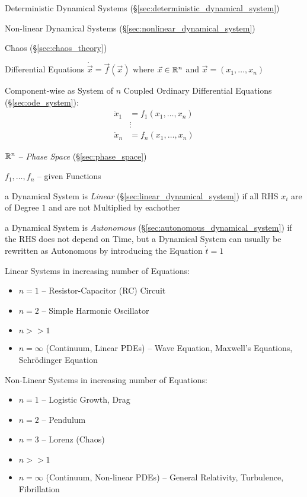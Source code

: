 Deterministic Dynamical Systems (\S\ref{sec:deterministic_dynamical_system})

Non-linear Dynamical Systems (\S\ref{sec:nonlinear_dynamical_system})

Chaos (\S\ref{sec:chaos_theory})

Differential Equations $\dot{\vec{x}} = \vec{f}(\vec{x})$ where
$\vec{x} \in \mathbb{R}^n$ and $\vec{x} = (x_1,\ldots,x_n)$

Component-wise as System of $n$ Coupled Ordinary Differential Equations
(\S\ref{sec:ode_system}):
\begin{align*}
  \dot{x}_1 & = f_1(x_1,\ldots,x_n) \\
            & \vdots \\
  \dot{x}_n & = f_n(x_1,\ldots,x_n)
\end{align*}

$\mathbb{R}^n$ -- \emph{Phase Space} (\S\ref{sec:phase_space})

$f_1, \ldots, f_n$ -- given Functions

a Dynamical System is \emph{Linear} (\S\ref{sec:linear_dynamical_system}) if
all RHS $x_i$ are of Degree $1$ and are not Multiplied by eachother

a Dynamical System is \emph{Autonomous}
(\S\ref{sec:autonomous_dynamical_system}) if the RHS does not depend on Time,
but a Dynamical System can usually be rewritten as Autonomous by introducing
the Equation $\dot{t} = 1$

Linear Systems in increasing number of Equations:
\begin{itemize}
  \item $n = 1$ -- Resistor-Capacitor (RC) Circuit
  \item $n = 2$ -- Simple Harmonic Oscillator
  \item $n >> 1$
  \item $n = \infty$ (Continuum, Linear PDEs) -- Wave Equation, Maxwell's
    Equations, Schr\"odinger Equation
\end{itemize}

Non-Linear Systems in increasing number of Equations:
\begin{itemize}
  \item $n = 1$ -- Logistic Growth, Drag
  \item $n = 2$ -- Pendulum
  \item $n = 3$ -- Lorenz (Chaos)
  \item $n >> 1$
  \item $n = \infty$ (Continuum, Non-linear PDEs) -- General Relativity,
    Turbulence, Fibrillation
\end{itemize}

